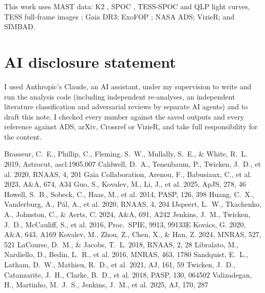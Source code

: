 \documentclass{aastex701}
\begin{document}
\begin{acknowledgments}
This work uses MAST data: K2 ,
SPOC , TESS-SPOC
 and QLP
 light curves, TESS
full-frame images ; Gaia DR3;
ExoFOP ; NASA ADS; VizieR; and
SIMBAD.
\end{acknowledgments}


\section*{AI disclosure statement}
I used Anthropic's Claude, an AI assistant, under my supervision to write and run the analysis code
(including independent re-analyses, an independent literature classification and adversarial
reviews by separate AI agents) and to draft this note. I checked every number against the saved
outputs and every reference against ADS, arXiv, Crossref or VizieR, and take full responsibility
for the content.

\begin{thebibliography}{}
 Brasseur, C.~E., Phillip, C., Fleming, S.~W., Mullally, S.~E., \& White, R.~L. 2019, Astrocut, ascl:1905.007
 Caldwell, D.~A., Tenenbaum, P., Twicken, J.~D., et al. 2020, RNAAS, 4, 201
 Gaia Collaboration, Arenou, F., Babusiaux, C., et al. 2023, A\&A, 674, A34
 Guo, S., Kovalev, M., Li, J., et al. 2025, ApJS, 278, 46
 Howell, S.~B., Sobeck, C., Haas, M., et al. 2014, PASP, 126, 398
 Huang, C.~X., Vanderburg, A., P\'al, A., et al. 2020, RNAAS, 4, 204
 IJspeert, L.~W., Tkachenko, A., Johnston, C., \& Aerts, C. 2024, A\&A, 691, A242
 Jenkins, J.~M., Twicken, J.~D., McCauliff, S., et al. 2016, Proc.\ SPIE, 9913, 99133E
 Kov\'acs, G. 2020, A\&A, 643, A169
 Kovalev, M., Zhou, Z., Chen, X., \& Han, Z. 2024, MNRAS, 527, 521
 LaCourse, D.~M., \& Jacobs, T.~L. 2018, RNAAS, 2, 28
 Libralato, M., Nardiello, D., Bedin, L.~R., et al. 2016, MNRAS, 463, 1780
 Sandquist, E.~L., Latham, D.~W., Mathieu, R.~D., et al. 2021, AJ, 161, 59
 Twicken, J.~D., Catanzarite, J.~H., Clarke, B.~D., et al. 2018, PASP, 130, 064502
 Valizadegan, H., Martinho, M.~J.~S., Jenkins, J.~M., et al. 2025, AJ, 170, 287
\end{thebibliography}
\end{document}
